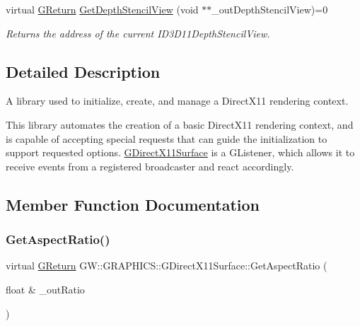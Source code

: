 \begin{DoxyCompactItemize}
virtual \hyperlink{namespaceGW_a67a839e3df7ea8a5c5686613a7a3de21}{G\+Return} \hyperlink{classGW_1_1GRAPHICS_1_1GDirectX11Surface_a44937f7b6e85b0b8df3ac6871c4b87a3}{Get\+Depth\+Stencil\+View} (void $\ast$$\ast$\+\_\+out\+Depth\+Stencil\+View)=0
\begin{DoxyCompactList}\small\item\em Returns the address of the current I\+D3\+D11\+Depth\+Stencil\+View. \end{DoxyCompactList}\end{DoxyCompactItemize}


\subsection{Detailed Description}
A library used to initialize, create, and manage a Direct\+X11 rendering context. 

This library automates the creation of a basic Direct\+X11 rendering context, and is capable of accepting special requests that can guide the initialization to support requested options. \hyperlink{classGW_1_1GRAPHICS_1_1GDirectX11Surface}{G\+Direct\+X11\+Surface} is a G\+Listener, which allows it to receive events from a registered broadcaster and react accordingly. 

\subsection{Member Function Documentation}
\mbox{\label{classGW_1_1GRAPHICS_1_1GDirectX11Surface_a4ae8372993803025a14a8471835ed231}} 
\subsubsection{\texorpdfstring{Get\+Aspect\+Ratio()}{GetAspectRatio()}}
{\footnotesize\ttfamily virtual \hyperlink{namespaceGW_a67a839e3df7ea8a5c5686613a7a3de21}{G\+Return} G\+W\+::\+G\+R\+A\+P\+H\+I\+C\+S\+::\+G\+Direct\+X11\+Surface\+::\+Get\+Aspect\+Ratio (\begin{DoxyParamCaption}\item[{float \&}]{\+\_\+out\+Ratio }\end{DoxyParamCaption})\hspace{0.3cm}{\ttfamily [pure virtual]}}



